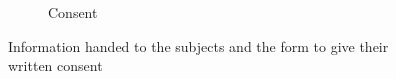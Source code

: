\begin{landscape}
\begin{figure}[ht]
\begin{subfigure}[b]{0.33\columnwidth}
			\caption{Consent}
			\label{fig:study-legal-consent}
		\end{subfigure}
		\captionsetup{subrefformat=parens}
		\caption[Documents: information \& concent]{Information handed to the subjects and the form to give their written consent}
		\label{fig:study-legal}
	\end{figure}
\end{landscape}